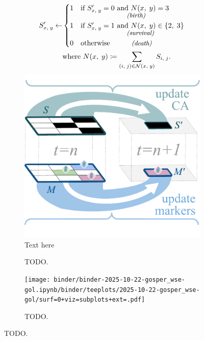 \begin{figure}

\begin{minipage}[c]{1.0\linewidth}%
\vspace*{0pt}%
\begin{subfigure}[]{0.35\linewidth}
    \centering
\begin{align*}
    S_{\fontsize{2}{12} \selectfont x,\; y}'
    \gets&
    \begin{cases}
        1 & \text{if } S_{\fontsize{2}{12} \selectfont x,\; y}' = 0 \text{ and } N(x,\; y) = 3\\[-1ex]
          &\hspace{15ex}\text{\small\textit{(birth)}}\\
        1 & \text{if } S_{\fontsize{2}{12} \selectfont x,\; y}' = 1 \text{ and } N(x,\; y) \in \{2,\; 3\}\\[-1ex]
          &\hspace{15ex}\text{\small\textit{(survival)}}\\
        0 & \text{otherwise} \hspace{7ex}\text{\small\textit{(death)}}
    \end{cases}\\
    & \text{where } N(x,\; y) \coloneqq \sum_{(i,\; j) \in \mathcal{N}(x,\; y)} S_{\fontsize{2}{12} \selectfont i,\; j}.
\end{align*}
\vspace{-3ex}
    \includegraphics[width=\linewidth, trim={0 0.5cm 0 0}, clip]{img/hstrat-synthesis-ca-update.pdf}
    Text here
    \caption{\footnotesize
    TODO.
    }
    \label{fig:use-case-gol:schematic}
\end{subfigure}%
\begin{subfigure}[]{0.65\linewidth}
    \centering
    \texttt{[image: binder/binder-2025-10-22-gosper\_wse-gol.ipynb/binder/teeplots/2025-10-22-gosper\_wse-gol/surf=0+viz=subplots+ext=.pdf]}
    \caption{\footnotesize
    TODO.
    }
    \label{fig:use-case-gol:phylo}
\end{subfigure}
\end{minipage}%


\end{figure}
